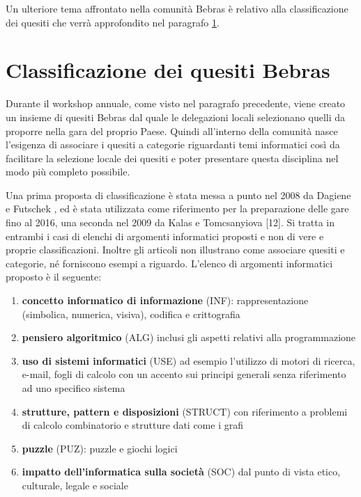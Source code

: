 \documentclass[12pt]{report}
\begin{document}
Un ulteriore tema affrontato nella comunità Bebras è relativo alla classificazione dei quesiti che verrà approfondito nel paragrafo \ref{Classificazione}.

%
%
%	
\section{Classificazione dei quesiti Bebras}\label{Classificazione}
Durante il workshop annuale, come visto nel paragrafo precedente, viene creato un insieme di quesiti Bebras dal quale le delegazioni locali selezionano quelli da proporre nella gara del proprio Paese. Quindi all'interno della comunità nasce l'esigenza di associare i quesiti a categorie riguardanti temi informatici così da facilitare la selezione locale dei quesiti e poter presentare questa disciplina nel modo più completo possibile.

Una prima proposta di classificazione è stata messa a punto nel 2008 da Dagiene e Futschek \cite{DagieneISEEP2008}, ed è stata utilizzata come riferimento per la preparazione delle gare fino al 2016, una seconda nel 2009 da Kalas e Tomcsanyiova [12]. Si tratta in entrambi i casi di elenchi di argomenti informatici proposti e non di vere e proprie classificazioni. Inoltre gli articoli non illustrano come associare quesiti e categorie, né forniscono esempi a riguardo.
L'elenco di argomenti informatici proposto è il seguente:

\begin{enumerate}
	\item \textbf{concetto informatico di informazione} (INF): rappresentazione (simbolica, numerica, visiva), codifica e crittografia
	
	\item \textbf{pensiero algoritmico} (ALG) inclusi gli aspetti relativi alla programmazione
	
	\item \textbf{uso di sistemi informatici} (USE) ad esempio l'utilizzo di motori di ricerca, e-mail, fogli di calcolo con un accento sui principi generali senza riferimento ad uno specifico sistema
	
	\item \textbf{strutture, pattern e disposizioni} (STRUCT) con riferimento a problemi di calcolo combinatorio e strutture dati come i grafi
	
	\item \textbf{puzzle} (PUZ): puzzle e giochi logici
	
	\item \textbf{impatto dell'informatica sulla società} (SOC) dal punto di vista etico, culturale, legale e sociale
\end{enumerate}
\end{document}
